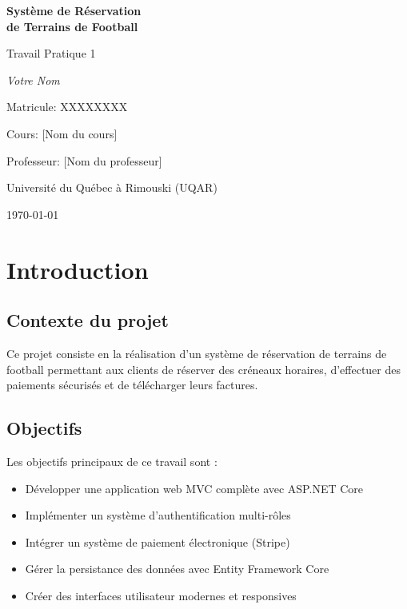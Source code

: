 \documentclass[12pt,a4paper]{article}
\begin{document}
\begin{titlepage}
    \centering
    \vspace*{2cm}
    
    {\Huge\bfseries Système de Réservation\\de Terrains de Football\par}
    \vspace{1cm}
    {\Large Travail Pratique 1\par}
    \vspace{2cm}
    
    {\Large\itshape Votre Nom\par}
    {\large Matricule: XXXXXXXX\par}
    \vspace{1cm}
    
    {\large Cours: [Nom du cours]\par}
    {\large Professeur: [Nom du professeur]\par}
    \vspace{2cm}
    
    {\large Université du Québec à Rimouski (UQAR)\par}
    \vspace{1cm}
    
    {\large\today\par}
    
    \vfill
\end{titlepage}

\tableofcontents
\newpage

\section{Introduction}

\subsection{Contexte du projet}
Ce projet consiste en la réalisation d'un système de réservation de terrains de football permettant aux clients de réserver des créneaux horaires, d'effectuer des paiements sécurisés et de télécharger leurs factures.

\subsection{Objectifs}
Les objectifs principaux de ce travail sont :
\begin{itemize}
    \item Développer une application web MVC complète avec ASP.NET Core
    \item Implémenter un système d'authentification multi-rôles
    \item Intégrer un système de paiement électronique (Stripe)
    \item Gérer la persistance des données avec Entity Framework Core
    \item Créer des interfaces utilisateur modernes et responsives
\end{itemize}
\end{document}
